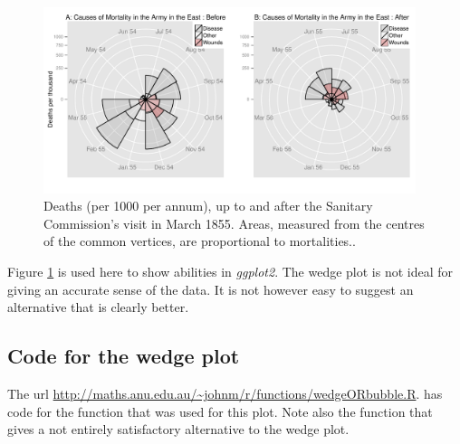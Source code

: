 \begin{figure}
\centerline{\includegraphics[width=0.97\textwidth]{colorArt/allwedge}}%
\caption{Deaths (per 1000 per annum), up to and after the
  Sanitary Commission's visit in March 1855.  Areas, measured from the
centres of the common vertices, are proportional
  to mortalities..\label{col:wedgeplot}}
\end{figure}

Figure \ref{col:wedgeplot} is used here to show abilities in
\textit{ggplot2}.  The wedge plot is not ideal for giving an accurate
sense of the data.  It is not however easy to suggest an alternative
that is clearly better.

\subsection*{ Code for the wedge plot}

The url
\url{http://maths.anu.edu.au/~johnm/r/functions/wedgeORbubble.R}. has code for the function  that was
used for this plot.  Note also the function  that
gives a not entirely satisfactory alternative to the wedge plot.

\newpage
